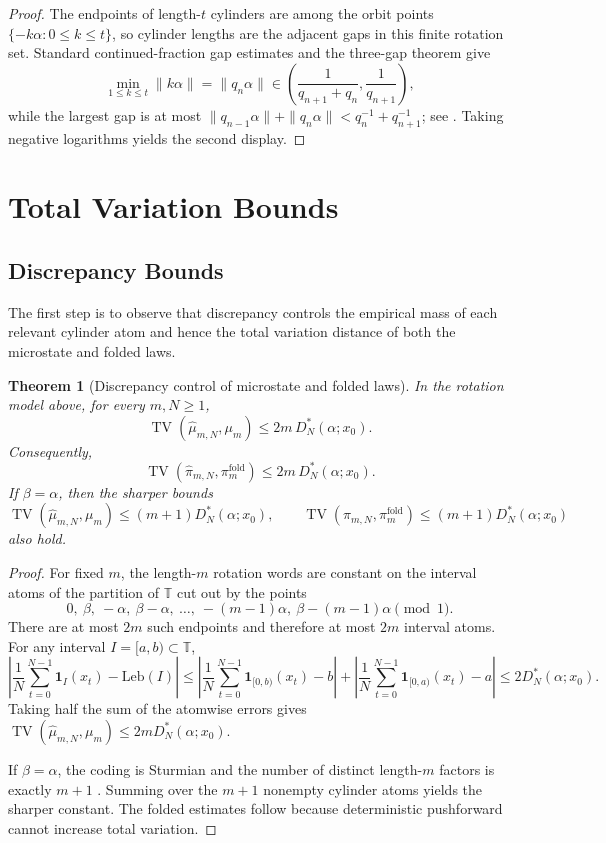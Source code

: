 \documentclass[11pt,letterpaper]{article}
\numberwithin{equation}{section}
\theoremstyle{plain}
\newtheorem{theorem}{Theorem}[section]
\theoremstyle{definition}
\theoremstyle{remark}
\newcommand{\TT}{\mathbb{T}}
\newcommand{\leb}{\mathrm{Leb}}
\DeclareMathOperator{\TV}{TV}
\begin{document}
\begin{proof}
The endpoints of length-$t$ cylinders are among the orbit points
$\{-k\alpha:0\le k\le t\}$, so cylinder lengths are the adjacent gaps in this
finite rotation set.  Standard continued-fraction gap estimates and the
three-gap theorem give
\[
\min_{1\le k\le t}\|k\alpha\|
=
\|q_n\alpha\|
\in
\left(\frac{1}{q_{n+1}+q_n},\frac{1}{q_{n+1}}\right),
\]
while the largest gap is at most
$\|q_{n-1}\alpha\|+\|q_n\alpha\|<q_n^{-1}+q_{n+1}^{-1}$; see
\cite{Slater1950DistributionIntegers,Slater1967GapsSteps}.  Taking negative
logarithms yields the second display.
\end{proof}

\section{Total Variation Bounds}

\subsection{Discrepancy Bounds}

The first step is to observe that discrepancy controls the empirical mass of
each relevant cylinder atom and hence the total variation distance of both the
microstate and folded laws.

\begin{theorem}[Discrepancy control of microstate and folded laws]\label{thm:tv-certificate-hist}
In the rotation model above, for every $m,N\ge 1$,
\[
\TV(\hat\mu_{m,N},\mu_m)\le 2m\,D_N^*(\alpha;x_0).
\]
Consequently,
\[
\TV(\hat\pi_{m,N},\pi_m^{\mathrm{fold}})
\le
2m\,D_N^*(\alpha;x_0).
\]
If \(\beta=\alpha\), then the sharper bounds
\[
\TV(\hat\mu_{m,N},\mu_m)\le (m+1)D_N^*(\alpha;x_0),
\qquad
\TV(\hat\pi_{m,N},\pi_m^{\mathrm{fold}})\le (m+1)D_N^*(\alpha;x_0)
\]
also hold.
\end{theorem}

\begin{proof}
For fixed $m$, the length-$m$ rotation words are constant on the interval atoms
of the partition of \(\TT\) cut out by the points
\[
0,\ \beta,\ -\alpha,\ \beta-\alpha,\ \dots,\ -(m-1)\alpha,\ \beta-(m-1)\alpha
\pmod 1.
\]
There are at most \(2m\) such endpoints and therefore at most \(2m\) interval
atoms. For any interval \(I=[a,b)\subset\TT\),
\[
\left|
\frac{1}{N}\sum_{t=0}^{N-1}\mathbf{1}_I(x_t)-\leb(I)
\right|
\le
\left|
\frac{1}{N}\sum_{t=0}^{N-1}\mathbf{1}_{[0,b)}(x_t)-b
\right|
{}+
\left|
\frac{1}{N}\sum_{t=0}^{N-1}\mathbf{1}_{[0,a)}(x_t)-a
\right|
\le 2D_N^*(\alpha;x_0).
\]
Taking half the sum of the atomwise errors gives
\(\TV(\hat\mu_{m,N},\mu_m)\le 2mD_N^*(\alpha;x_0)\).

If \(\beta=\alpha\), the coding is Sturmian and the number of distinct
length-\(m\) factors is exactly \(m+1\)
\cite{MorseHedlund1940,LindMarcus1995}. Summing over the \(m+1\) nonempty
cylinder atoms yields the sharper constant. The folded estimates follow because
deterministic pushforward cannot increase total variation.
\end{proof}
\end{document}
